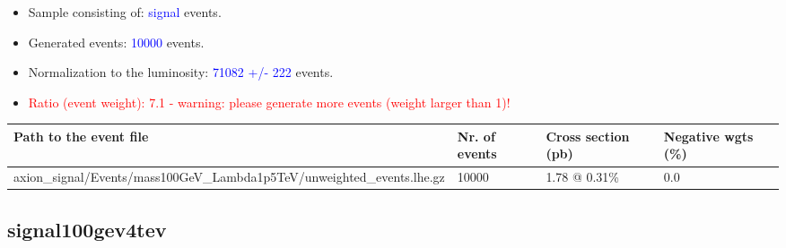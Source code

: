 \documentclass[a4paper, 10pt]{article}
\begin{document}
\begin{itemize}
  \item Sample consisting of: \textcolor{blue}{signal}  events.
   \item Generated events: \textcolor{blue}{10000 }  events.
   \item Normalization to the luminosity: \textcolor{blue}{71082}\textcolor{blue}{ +/\-- }\textcolor{blue}{222 }  events.
   \item\textcolor{red}{Ratio (event weight): }\textcolor{red}{7.1 }\textcolor{red}{ - warning: please generate more events (weight larger than 1)!}
\textcolor{red}{}
\end{itemize}
\begin{table}[H]
  \begin{center}
    \begin{tabular}{|m{55.0mm}|m{25.0mm}|m{30.0mm}|m{30.0mm}|}
      \hline
      {\cellcolor{yellow}         Path to the event file}& {\cellcolor{yellow}         Nr. of events}& {\cellcolor{yellow}         Cross section (pb)}& {\cellcolor{yellow}         Negative wgts (\%)}\\
      \hline
      {\cellcolor{white}          axion\_signal/\-Events/\-mass100GeV\_Lambda1p5TeV/\-unweighted\_events.lhe.gz}& {\cellcolor{white}          10000}& {\cellcolor{white}          1.78 @ 0.31\%}& {\cellcolor{white}          0.0}\\
\hline
    \end{tabular}
  \end{center}
\end{table}

\subsection{ signal100gev4tev}
\end{document}
